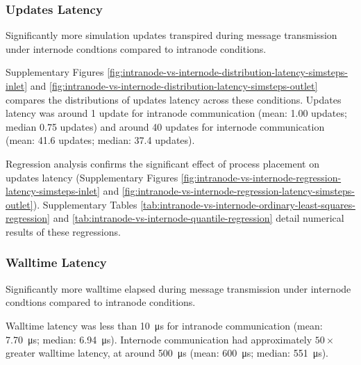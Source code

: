 \subsubsection{Updates Latency}

Significantly more simulation updates transpired during message transmission under internode condtions compared to intranode conditions.

Supplementary Figures \ref{fig:intranode-vs-internode-distribution-latency-simsteps-inlet} and \ref{fig:intranode-vs-internode-distribution-latency-simsteps-outlet} compares the distributions of updates latency across these conditions.
Updates latency was around 1 update for intranode communication (mean: 1.00 updates; median 0.75 updates) and around 40 updates for internode communication (mean: 41.6 updates; median: 37.4 updates).

Regression analysis confirms the significant effect of process placement on updates latency (Supplementary Figures \ref{fig:intranode-vs-internode-regression-latency-simsteps-inlet} and \ref{fig:intranode-vs-internode-regression-latency-simsteps-outlet}).
Supplementary Tables \ref{tab:intranode-vs-internode-ordinary-least-squares-regression} and \ref{tab:intranode-vs-internode-quantile-regression} detail numerical results of these regressions.

\subsubsection{Walltime Latency}

Significantly more walltime elapsed during message transmission under internode condtions compared to intranode conditions.

Walltime latency was less than \SI{10}{\micro\second} for intranode communication (mean: \SI{7.70}{\micro\second}; median: \SI{6.94}{\micro\second}).
Internode communication had approximately $50\times$ greater walltime latency, at around \SI{500}{\micro\second} (mean: \SI{600}{\micro\second}; median: \SI{551}{\micro\second}).

